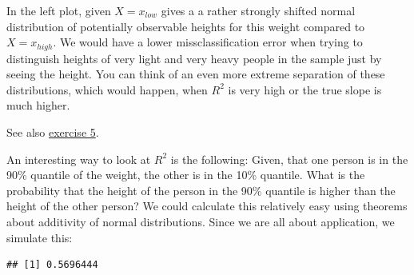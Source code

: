 \documentclass[
]{book}
\newenvironment{Shaded}{\begin{snugshade}}{\end{snugshade}}
\newcommand{\AttributeTok}[1]{\textcolor[rgb]{0.13,0.29,0.53}{#1}}
\newcommand{\CommentTok}[1]{\textcolor[rgb]{0.56,0.35,0.01}{\textit{#1}}}
\newcommand{\DecValTok}[1]{\textcolor[rgb]{0.00,0.00,0.81}{#1}}
\newcommand{\FloatTok}[1]{\textcolor[rgb]{0.00,0.00,0.81}{#1}}
\newcommand{\FunctionTok}[1]{\textcolor[rgb]{0.13,0.29,0.53}{\textbf{#1}}}
\newcommand{\NormalTok}[1]{#1}
\newcommand{\OtherTok}[1]{\textcolor[rgb]{0.56,0.35,0.01}{#1}}
\newcommand{\SpecialCharTok}[1]{\textcolor[rgb]{0.81,0.36,0.00}{\textbf{#1}}}
\begin{document}
In the left plot, given \(X = x_{low}\) gives a a rather strongly shifted normal distribution of
potentially observable heights for this weight compared to \(X=x_{high}\).
We would have a lower missclassification error when trying to distinguish heights
of very light and very heavy people in the sample just by seeing the height.
You can think of an even more extreme separation of these distributions,
which would happen, when \(R^2\) is very high or the true slope is much higher.

See also \hyperref[exercise5_simpl_lin_reg]{exercise 5}.

An interesting way to look at \(R^2\) is the following:
Given, that one person is in the 90\% quantile of the weight,
the other is in the 10\% quantile. What is the probability that the
height of the person in the 90\% quantile is higher than the height of the other person?
We could calculate this relatively easy using theorems about additivity of normal distributions.
Since we are all about application, we simulate this:

\begin{Shaded}
\end{Shaded}

\begin{verbatim}
## [1] 0.5696444
\end{verbatim}

\begin{Shaded}
\end{Shaded}
\end{document}
